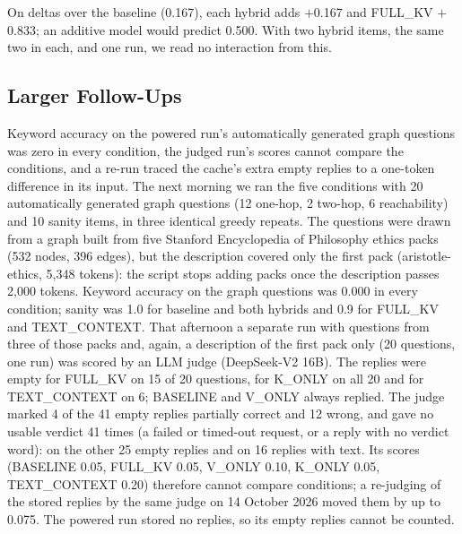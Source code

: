 \documentclass[11pt,a4paper]{article}
\begin{document}
On deltas over the baseline (0.167), each hybrid adds $+$0.167 and FULL\_KV $+$0.833; an additive model would predict 0.500. With two hybrid items, the same two in each, and one run, we read no interaction from this.

\subsection{Larger Follow-Ups}
\label{sec:followups}

Keyword accuracy on the powered run's automatically generated graph questions was zero in every condition, the judged run's scores cannot compare the conditions, and a re-run traced the cache's extra empty replies to a one-token difference in its input. The next morning we ran the five conditions with 20 automatically generated graph questions (12 one-hop, 2 two-hop, 6 reachability) and 10 sanity items, in three identical greedy repeats. The questions were drawn from a graph built from five Stanford Encyclopedia of Philosophy ethics packs (532 nodes, 396 edges), but the description covered only the first pack (aristotle-ethics, 5,348 tokens): the script stops adding packs once the description passes 2,000 tokens. Keyword accuracy on the graph questions was 0.000 in every condition; sanity was 1.0 for baseline and both hybrids and 0.9 for FULL\_KV and TEXT\_CONTEXT. That afternoon a separate run with questions from three of those packs and, again, a description of the first pack only (20 questions, one run) was scored by an LLM judge (DeepSeek-V2 16B). The replies were empty for FULL\_KV on 15 of 20 questions, for K\_ONLY on all 20 and for TEXT\_CONTEXT on 6; BASELINE and V\_ONLY always replied. The judge marked 4 of the 41 empty replies partially correct and 12 wrong, and gave no usable verdict 41 times (a failed or timed-out request, or a reply with no verdict word): on the other 25 empty replies and on 16 replies with text. Its scores (BASELINE 0.05, FULL\_KV 0.05, V\_ONLY 0.10, K\_ONLY 0.05, TEXT\_CONTEXT 0.20) therefore cannot compare conditions; a re-judging of the stored replies by the same judge on 14 October 2026 moved them by up to 0.075. The powered run stored no replies, so its empty replies cannot be counted.
\end{document}
